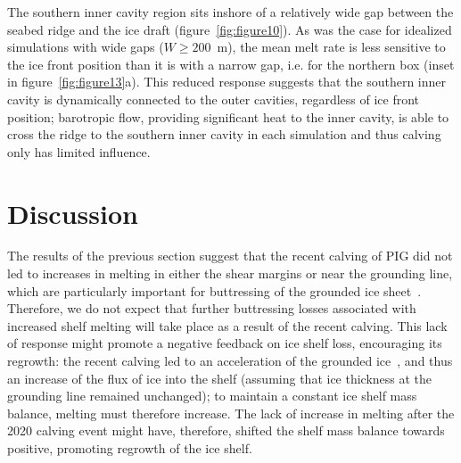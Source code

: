 \documentclass[draft]{agujournal2019}
\begin{document}

The southern inner cavity region sits inshore of a relatively wide gap between the seabed ridge and the ice draft (figure~\ref{fig:figure10}). As was the case for idealized simulations with wide gaps ($W\geq200$~m), the mean melt rate is less sensitive to the ice front position than it is with a narrow gap, i.e. for the northern box (inset in figure~\ref{fig:figure13}a). This reduced response suggests that the southern inner cavity is dynamically connected to the outer cavities, regardless of ice front position; barotropic flow, providing significant heat to the inner cavity, is able to cross the ridge to the southern inner cavity in each simulation and thus calving only has limited influence. 


\section{Discussion}\label{S:Discussion}
The results of the previous section suggest that the recent calving of PIG did not led to increases in melting in either the shear margins or near the grounding line, which are particularly important for buttressing of the grounded ice sheet~\cite{Reese2018NatureClimCh}. Therefore, we do not expect that further buttressing losses associated with increased shelf melting will take place as a result of the recent calving. This lack of response might promote a negative feedback on ice shelf loss, encouraging its regrowth: the recent calving led to an acceleration of the grounded ice~\cite{Joughin2021ScienceAdv}, and thus an increase of the flux of ice into the shelf (assuming that ice thickness at the grounding line remained unchanged); to maintain a constant ice shelf mass balance, melting must therefore increase. The lack of increase in melting after the 2020 calving event might have, therefore, shifted the shelf mass balance towards positive, promoting regrowth of the ice shelf.
\end{document}
